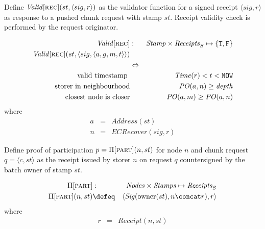 \begin{definition}
\label{def:receipt-validity}
Define  $\mathit{Valid}[\textsc{\lowercase{REC}}](st,\langle sig,r\rangle)$ as the validator function for a signed receipt $\langle sig,r\rangle$ as response to a pushed chunk request with stamp $st$. Receipt validity check is performed by the request originator.

\begin{eqnarray}
\mathit{Valid}[\textsc{\lowercase{REC}}] &:&\mathit{Stamp}\times\mathit{Receipts}_S\mapsto\{\mathtt{T,F}\}\\
\mathit{Valid}[\textsc{\lowercase{REC}}](st,\langle sig,\langle
a, g, m, t \rangle\rangle)\\
&\Leftrightarrow&\\
\text{valid timestamp } &&\mathit{Time}(r)<t<\mathtt{NOW}\\
\text{storer in neighbourhood} && \mathit{PO}(a,n)\geq \mathit{depth}\\
\text{closest node is closer} && \mathit{PO}(a,m)\geq\mathit{PO}(a,n)
\end{eqnarray}
where
\begin{eqnarray}
a&=&\mathit{Address}(st)\\
n&= &\mathit{ECRecover}(sig,r)
\end{eqnarray}
\end{definition}


\begin{definition}
\label{def:pop}
Define  proof of participation $p=\Pi[\textsc{\lowercase{PART}}](n, st)$ for node $n$
and chunk request $q=\langle c,st\rangle$ as the receipt issued by storer $n$ on request $q$ countersigned by the batch owner of stamp $st$.

\begin{eqnarray}
\Pi[\textsc{\lowercase{PART}}] &:& \mathit{Nodes}\times\mathit{Stamps}\mapsto \mathit{Receipts}_S\\
\Pi[\textsc{\lowercase{PART}}](n,st) &\defeq&  \langle\mathit{Sig}(\mathrm{owner}(st),n\concat r), r\rangle
\end{eqnarray}
where
\begin{eqnarray}
r &=& \mathit{Receipt}(n, st)
\end{eqnarray}
\end{definition}


